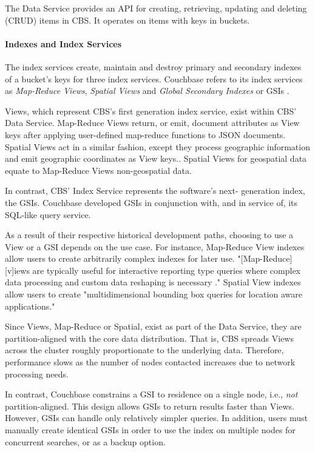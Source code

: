 \documentclass[9pt,twocolumn,twoside]{styles/osajnl}
\begin{document}
The Data Service provides an API for creating, retrieving, updating and deleting (CRUD) items in CBS.  It operates on items with keys in buckets.

\paragraph{Indexes and Index Services} The index services create, maintain and destroy primary and secondary indexes of a bucket's keys for three index services.  Couchbase refers to its index services as \textit{Map-Reduce Views},  \textit{Spatial Views} and \textit{Global Secondary Indexes} or GSIs \cite{www-viewsindexing-cbsinc}.  

Views, which represent CBS's first generation index service, exist within CBS' Data Service.  Map-Reduce Views return, or emit, document attributes as View keys after applying user-defined map-reduce functions to JSON documents. Spatial Views act in a similar fashion, except they process geographic information and emit geographic coordinates as View keys.\cite{www-queries-cbsinc}.  Spatial Views for geospatial data equate to Map-Reduce Views non-geospatial data.

In contrast, CBS' Index Service represents the software's next-
generation index, the GSIs.  Couchbase developed GSIs in conjunction with, and in service of, its SQL-like query service.

As a result of their respective historical development paths, choosing to use a View or a GSI depends on the use case. For instance, Map-Reduce View indexes allow users to create arbitrarily complex indexes for later use.  "[Map-Reduce][v]iews are typically useful for interactive reporting type queries where complex data processing and custom data reshaping is necessary \cite{www-viewsindexing-cbsinc}." Spatial View indexes allow users to create "multidimensional bounding box queries for location aware applications." \cite{www-viewsindexing-cbsinc}

Since Views, Map-Reduce or Spatial, exist as part of the Data Service, they are partition-aligned with the core data distribution.  That is, CBS spreads Views across the cluster roughly proportionate to the underlying data.  Therefore, performance slows as the number of nodes contacted increases due to network processing needs.

In contrast, Couchbase constrains a GSI to residence on a single node, i.e., \textit{not} partition-aligned.  This design allows GSIs to return results faster than Views.  However, GSIs can handle only relatively simpler queries.  In addition, users must manually create identical GSIs in order to use the index on multiple nodes for concurrent searches, or as a backup option.
\end{document}
